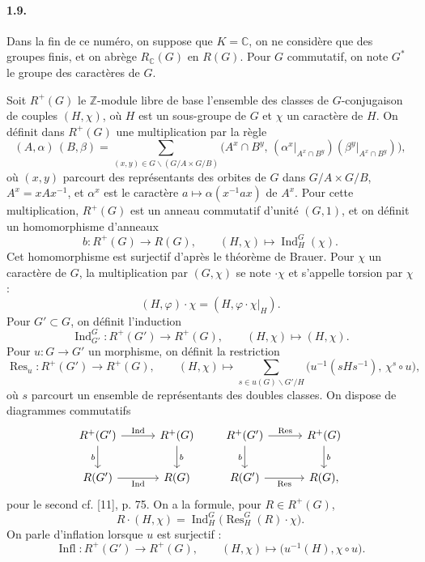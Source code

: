 \documentclass[10pt,letterpaper]{article}
\newcommand{\C}{\mathbb C}
\newcommand{\Z}{\mathbb Z}
\newcommand{\Ind}{\operatorname{Ind}}
\newcommand{\Res}{\operatorname{Res}}
\providecommand{\Ind}{\operatorname{Ind}}
\begin{document}
\paragraph{1.9.} Dans la fin de ce numéro, on suppose que \(K=\C\), on ne considère que des groupes finis, et on abrège \(R_\C(G)\) en \(R(G)\). Pour \(G\) commutatif, on note \(G^*\) le groupe des caractères de \(G\).

Soit \(R^+(G)\) le \(\Z\)-module libre de base l'ensemble des classes de \(G\)-conjugaison de couples \((H,\chi)\), où \(H\) est un sous-groupe de \(G\) et \(\chi\) un caractère de \(H\). On définit dans \(R^+(G)\) une multiplication par la règle
\[
\tag{1.9.1}
(A,\alpha)\,(B,\beta)=
\sum_{(x,y)\in G\backslash(G/A\times G/B)}
\bigl(A^x\cap B^y,\,
(\alpha^x|_{A^x\cap B^y})(\beta^y|_{A^x\cap B^y})\bigr),
\]
où \((x,y)\) parcourt des représentants des orbites de \(G\) dans \(G/A\times G/B\), \(A^x=xAx^{-1}\), et \(\alpha^x\) est le caractère \(a\mapsto \alpha(x^{-1}ax)\) de \(A^x\). Pour cette multiplication, \(R^+(G)\) est un anneau commutatif d'unité \((G,1)\), et on définit un homomorphisme d'anneaux
\[
\tag{1.9.2}
b:R^+(G)\longrightarrow R(G),\qquad (H,\chi)\longmapsto \Ind_H^G(\chi).
\]
Cet homomorphisme est surjectif d'après le théorème de Brauer. Pour \(\chi\) un caractère de \(G\), la multiplication par \((G,\chi)\) se note \(\cdot\chi\) et s'appelle torsion par \(\chi\):
\[
\tag{1.9.3}
(H,\varphi)\cdot\chi=(H,\varphi\cdot\chi|_H).
\]
Pour \(G'\subset G\), on définit l'induction
\[
\tag{1.9.4}
\Ind_{G'}^G:R^+(G')\longrightarrow R^+(G),\qquad (H,\chi)\longmapsto(H,\chi).
\]
Pour \(u:G\to G'\) un morphisme, on définit la restriction
\[
\tag{1.9.5}
\Res_u:R^+(G')\longrightarrow R^+(G),\qquad (H,\chi)\longmapsto
\sum_{s\in u(G)\backslash G'/H}
\bigl(u^{-1}(sHs^{-1}),\,\chi^s\circ u\bigr),
\]
où \(s\) parcourt un ensemble de représentants des doubles classes. On dispose de diagrammes commutatifs
\[
\begin{tikzcd}[column sep=3.0em,row sep=2.0em]
R^+(G') \arrow[r,"\Ind"] \arrow[d,"b"'] & R^+(G) \arrow[d,"b"]\\
R(G') \arrow[r,"\Ind"'] & R(G)
\end{tikzcd}
\qquad
\begin{tikzcd}[column sep=3.0em,row sep=2.0em]
R^+(G') \arrow[r,"\Res"] \arrow[d,"b"'] & R^+(G) \arrow[d,"b"]\\
R(G') \arrow[r,"\Res"'] & R(G),
\end{tikzcd}
\]
pour le second cf. [11], p. 75. On a la formule, pour \(R\in R^+(G)\),
\[
\tag{1.9.6}
R\cdot(H,\chi)=\Ind_H^G\bigl(\Res_H^G(R)\cdot\chi\bigr).
\]
On parle d'inflation lorsque \(u\) est surjectif :
\[
\tag{1.9.7}
\operatorname{Infl}:R^+(G')\longrightarrow R^+(G),\qquad
(H,\chi)\longmapsto\bigl(u^{-1}(H),\chi\circ u\bigr).
\]
\end{document}
